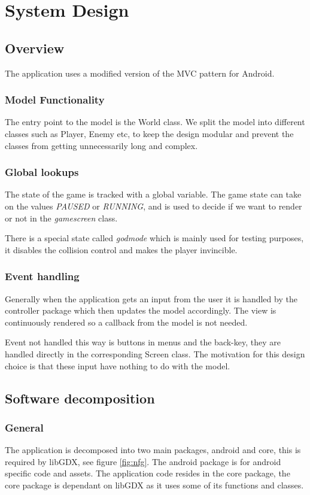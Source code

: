 \documentclass{article}
\begin{document}
\section{System Design}
\subsection{Overview}
The application uses a modified version of the MVC pattern for Android.

\subsubsection{Model Functionality}
The entry point to the model is the World class. We split the model into different classes such as Player, Enemy etc, to keep the design modular and prevent the classes from getting unnecessarily long and complex.

\subsubsection{Global lookups}
The state of the game is tracked with a global variable. The game state can take on the values \textit{PAUSED} or \textit{RUNNING}, and is used to decide if we want to render or not in the \textit{gamescreen} class.
 
There is a special state called \textit{godmode} which is mainly used for testing purposes, it disables the collision control and makes the player invincible.
    
\subsubsection{Event handling}
Generally when the application gets an input from the user it is handled by the controller package which then updates the model accordingly. The view is continuously rendered so a callback from the model is not needed.

Event not handled this way is buttons in menus and the back-key, they are handled directly in the corresponding Screen class. The motivation for this design choice is that these input have nothing to do with the model.

\subsection{Software decomposition}
\subsubsection{General}
The application is decomposed into two main packages, android and core, this is required by libGDX, see figure \ref{fig:nfg}. The android package is for android specific code and assets. The application code resides in the core package, the core package is dependant on libGDX as it uses some of its functions and classes.
\end{document}
